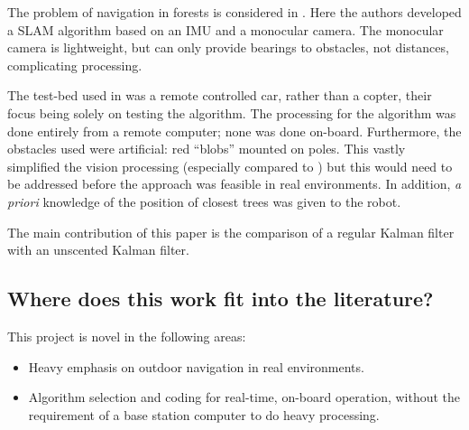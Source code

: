 \documentclass[12pt,oneside,a4paper]{book}
\begin{document}



The problem of navigation in forests is considered in
\cite{langelaan2005towards}. Here the authors developed a \gls{SLAM}
algorithm based on an \gls{IMU} and a monocular camera. The monocular
camera is lightweight, but can only provide bearings to obstacles, not
distances, complicating processing.

The test-bed used in \cite{langelaan2005towards} was a remote
controlled car, rather than a copter, their focus being solely on testing the
algorithm. The processing for the algorithm was done entirely from a
remote computer; none was done on-board. Furthermore, the obstacles
used were artificial: red ``blobs'' mounted on poles. This vastly
simplified the vision processing (especially compared to
\cite{5152680}) but this would need to be addressed before the
approach was feasible in real environments. In addition, \emph{a
  priori} knowledge of the position of  closest trees was given to the robot.

The main contribution of this paper is the comparison of a regular
Kalman filter with an unscented Kalman filter. 
 
\subsection{Where does this work fit into the literature?}
\label{sec:where-does-this}

This project is novel in the following areas:
\begin{itemize}
\item Heavy emphasis on outdoor navigation in real environments.
\item Algorithm selection and coding for real-time, on-board
  operation, without the requirement of a base station computer to
  do heavy processing.
\end{itemize}
\end{document}
